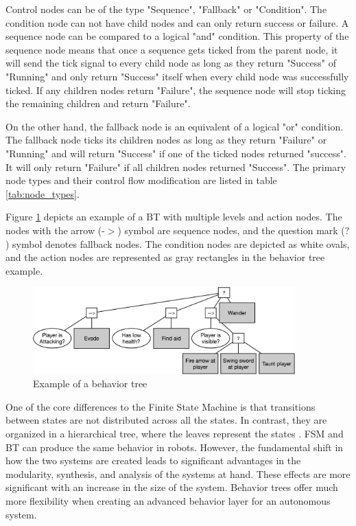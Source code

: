 Control nodes can be of the type "Sequence", "Fallback" or "Condition". The condition node can not have child nodes and can only return success or failure. A sequence node can be compared to a logical "and" condition. This property of the sequence node means that once a sequence gets ticked from the parent node, it will send the tick signal to every child node as long as they return "Success" of "Running" and only return "Success" itself when every child node was successfully ticked. If any children nodes return "Failure", the sequence node will stop ticking the remaining children and return "Failure".

On the other hand, the fallback node is an equivalent of a logical "or" condition. The fallback node ticks its children nodes as long as they return "Failure" or "Running" and will return "Success" if one of the ticked nodes returned "success". It will only return "Failure" if all children nodes returned "Success". The primary node types and their control flow modification are listed in table \ref{tab:node_types}.

Figure \ref{fig:bt_example} depicts an example of a BT with multiple levels and action nodes. The nodes with the arrow (-$>$) symbol are sequence nodes, and the question mark ($?$) symbol denotes fallback nodes. The condition nodes are depicted as white ovals, and the action nodes are represented as gray rectangles in the behavior tree example.

\begin{figure}[ht]
	\centering
	\includegraphics[width=0.9\textwidth]{images/bt_example.jpg} 
	\caption{Example of a behavior tree \cite{iovino2022}}
	\label{fig:bt_example}
\end{figure}

One of the core differences to the Finite State Machine is that transitions between states are not distributed across all the states. In contrast, they are organized in a hierarchical tree, where the leaves represent the states \cite{iovino2022}. FSM and BT can produce the same behavior in robots. However, the fundamental shift in how the two systems are created leads to significant advantages in the modularity, synthesis, and analysis of the systems at hand. These effects are more significant with an increase in the size of the system. Behavior trees offer much more flexibility when creating an advanced behavior layer for an autonomous system. 

